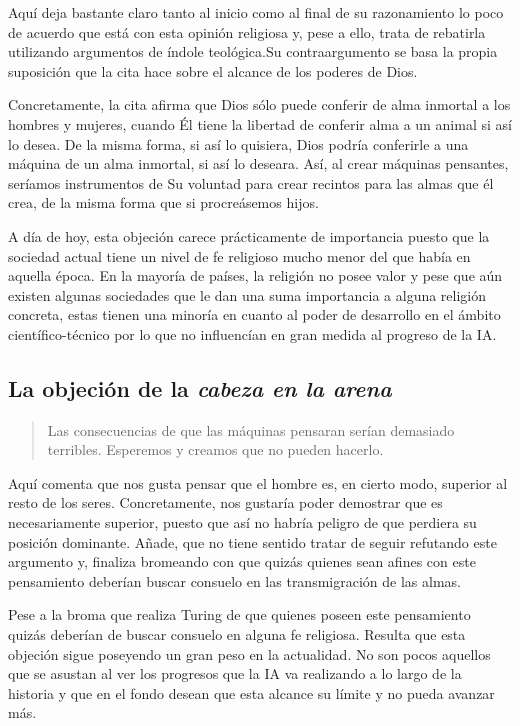 \documentclass[12pt,a4paper]{article}
\begin{document}
Aquí deja bastante claro tanto al inicio como al final de su razonamiento lo poco de acuerdo que está con esta opinión religiosa y, pese a ello, trata de rebatirla utilizando argumentos de índole teológica.Su contraargumento se basa la propia suposición que la cita hace sobre el alcance de los poderes de Dios.

Concretamente, la cita afirma que Dios sólo puede conferir de alma inmortal a los hombres y mujeres, cuando Él tiene la libertad de conferir alma a un animal si así lo desea. De la misma forma, si así lo quisiera, Dios podría conferirle a una máquina de un alma inmortal, si así lo deseara. Así, al crear máquinas pensantes, seríamos instrumentos de Su voluntad para crear recintos para las almas que él crea, de la misma forma que si procreásemos hijos.

A día de hoy, esta objeción carece prácticamente de importancia puesto que la sociedad actual tiene un nivel de fe religioso mucho menor del que había en aquella época. En la mayoría de países, la religión no posee valor y pese que aún existen algunas sociedades que le dan una suma importancia a alguna religión concreta, estas tienen una minoría en cuanto al poder de desarrollo en el ámbito científico-técnico por lo que no influencían en gran medida al progreso de la IA.

\subsection{La objeción de la \emph{cabeza en la arena}}
\begin{quote}\small Las consecuencias de que las máquinas pensaran serían demasiado terribles. Esperemos y creamos que no pueden hacerlo.\end{quote}

Aquí comenta que nos gusta pensar que el hombre es, en cierto modo, superior al resto de los seres. Concretamente, nos gustaría poder demostrar que es necesariamente superior, puesto que así no habría peligro de que perdiera su posición dominante. Añade, que no tiene sentido tratar de seguir refutando este argumento y, finaliza bromeando con que quizás quienes sean afines con este pensamiento deberían buscar consuelo en las transmigración de las almas.

Pese a la broma que realiza Turing de que quienes poseen este pensamiento quizás deberían de buscar consuelo en alguna fe religiosa. Resulta que esta objeción sigue poseyendo un gran peso en la actualidad. No son pocos aquellos que se asustan al ver los progresos que la IA va realizando a lo largo de la historia y que en el fondo desean que esta alcance su límite y no pueda avanzar más.
\end{document}
